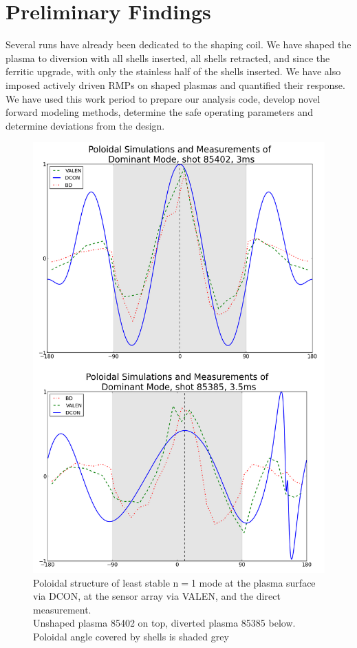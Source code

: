 \documentclass[aps,prl,twocolumn,superscriptaddress,groupedaddress]{revtex4}  %
\begin{document}
\section{Preliminary Findings}
	Several runs have already been dedicated to the shaping coil.  We have shaped the plasma to diversion with all shells inserted, all shells retracted, and since the ferritic upgrade, with only the stainless half of the shells inserted.  We have also imposed actively driven RMPs on shaped plasmas and quantified their response.  We have used this work period to prepare our analysis code, develop novel forward modeling methods, determine the safe operating parameters and determine deviations from the design. \par 
\begin{figure}[b]
	\centering
\includegraphics[scale=.22]{../Plots/DCON_VALEN_BD_comp_sh_unsh.png}\caption{Poloidal structure of least stable n$=$1 mode at the plasma surface via DCON, at the sensor array via VALEN, and the direct measurement.\\  Unshaped plasma 85402 on top, diverted plasma 85385 below.  Poloidal angle covered by shells is shaded grey}
	\label{nat_mode_sim_v_meas}
	\end{figure}
\end{document}
